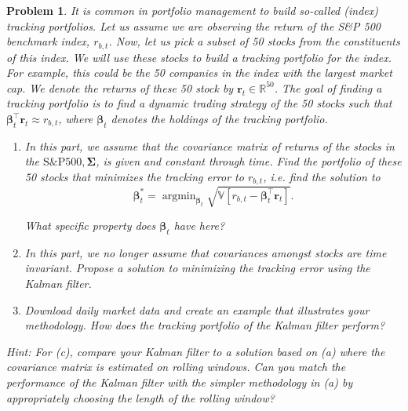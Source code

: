 \documentclass[11pt]{article}
\theoremstyle{plain} %
\newtheorem{problem}[theorem]{Problem}
\theoremstyle{remark}
\begin{document}
\begin{problem}
It is common in portfolio management to build so-called (index) tracking
portfolios. Let us assume we are observing the return of the S\&P 500 benchmark
index, $r_{b, t}$. Now, let us pick a subset of 50 stocks from the constituents
of this index. We will use these stocks to build a tracking portfolio for the
index. For example, this could be the 50 companies in the index with the largest
market cap. We denote the returns of these 50 stock by $\mathbf{r}_t \in
  \mathbb{R}^{50}$. The goal of finding a tracking portfolio is to find a dynamic
trading strategy of the 50 stocks such that $\boldsymbol{\beta}_t^\top
  \mathbf{r}_t \approx r_{b, t}$, where $\boldsymbol{\beta}_t$ denotes the
holdings of the tracking portfolio.
\begin{enumerate}[label=(\alph*)]
  \item In this part, we assume that the covariance matrix of returns of the
        stocks in the $\mathrm{S} \& \mathrm{P} 500, \boldsymbol{\Sigma}$, is given
        and constant through time. Find the portfolio of these 50 stocks that
        minimizes the tracking error to $r_{b, t}$, i.e. find the solution to
        $$
          \boldsymbol{\beta}_t^*=\operatorname{argmin}_{\boldsymbol{\beta}_t} \sqrt{\mathbb{V}\left[r_{b, t}-\boldsymbol{\beta}_t^\top \mathbf{r}_t\right]} .
        $$

        What specific property does $\boldsymbol{\beta}_t$ have here?
  \item In this part, we no longer assume that covariances amongst stocks are
        time invariant. Propose a solution to minimizing the tracking error using the
        Kalman filter.
  \item Download daily market data and create an example that illustrates your
        methodology. How does the tracking portfolio of the Kalman filter perform?
\end{enumerate}
Hint: For (c), compare your Kalman filter to a solution based on (a) where the
covariance matrix is estimated on rolling windows. Can you match the performance
of the Kalman filter with the simpler methodology in (a) by appropriately
choosing the length of the rolling window?
\end{problem}
\end{document}
